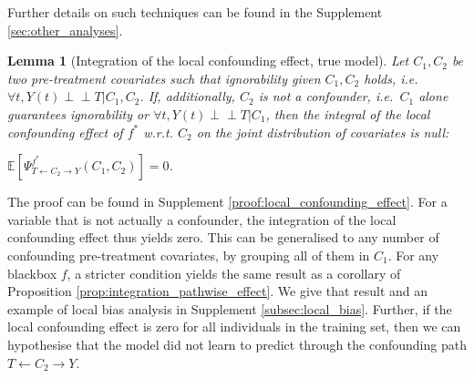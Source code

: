\documentclass{article}
\theoremstyle{plain}
\newtheorem{lemma}[theorem]{Lemma}
\theoremstyle{definition}
\theoremstyle{remark}
\newcommand{\effect}{\Psi}
\theoremstyle{mystyle}
\newcommand{\indep}{\perp\!\!\!\!\perp}
\begin{document}
 Further details on such techniques can be found in the Supplement \ref{sec:other_analyses}.
\begin{lemma}[Integration of the local confounding effect, true model] \label{lemma:local_confounding_effect}
 Let $C_1, C_2$ be two pre-treatment covariates such that ignorability given $C_1, C_2$ holds, i.e.\ $\forall t, Y(t) \indep T | C_1,C_2$. If, additionally, $C_2$ is not a confounder, i.e.\ $C_1$ alone guarantees ignorability or $\forall t, Y(t) \indep T | C_1$, then the integral of the local confounding effect of $f^*$ w.r.t. $C_2$ on the joint distribution of covariates is null: \\
\centerline{$\mathbb{E}[\effect^{f^*}_{T \leftarrow C_2 \rightarrow Y}(C_1,C_2)] = 0$.}
\end{lemma}

The proof can be found in Supplement \ref{proof:local_confounding_effect}. For a variable that is not actually a confounder, the integration of the local confounding effect thus yields zero. This can be generalised to any number of confounding pre-treatment covariates, by grouping all of them in $C_1$. For any blackbox $f$, a stricter condition yields the same result as a corollary of Proposition \ref{prop:integration_pathwise_effect}. We give that result and an example of local bias analysis in Supplement \ref{subsec:local_bias}. Further, if the local confounding effect is zero for all individuals in the training set, then we can hypothesise that the model did not learn to predict through the confounding path $T \leftarrow C_2 \rightarrow Y$. %
\end{document}
